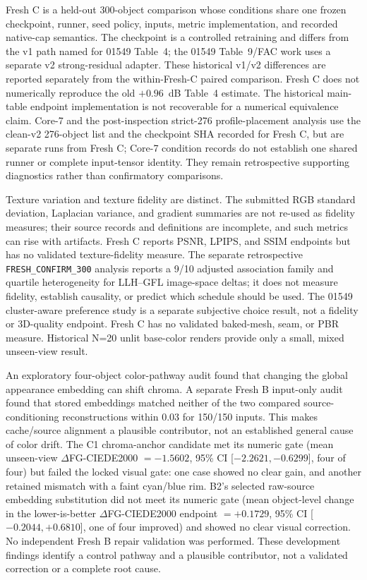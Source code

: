 \documentclass[times,twocolumn,final]{elsarticle}
\begin{document}
Fresh C is a held-out 300-object comparison whose conditions share one frozen checkpoint, runner, seed policy, inputs, metric implementation, and recorded native-cap semantics. The checkpoint is a controlled retraining and differs from the v1 path named for 01549 Table~4; the 01549 Table~9/FAC work uses a separate v2 strong-residual adapter. These historical v1/v2 differences are reported separately from the within-Fresh-C paired comparison. Fresh C does not numerically reproduce the old $+0.96$~dB Table~4 estimate. The historical main-table endpoint implementation is not recoverable for a numerical equivalence claim. Core-7 and the post-inspection strict-276 profile-placement analysis use the clean-v2 276-object list and the checkpoint SHA recorded for Fresh C, but are separate runs from Fresh C; Core-7 condition records do not establish one shared runner or complete input-tensor identity. They remain retrospective supporting diagnostics rather than confirmatory comparisons.

Texture variation and texture fidelity are distinct. The submitted RGB standard deviation, Laplacian variance, and gradient summaries are not re-used as fidelity measures; their source records and definitions are incomplete, and such metrics can rise with artifacts. Fresh C reports PSNR, LPIPS, and SSIM endpoints but has no validated texture-fidelity measure. The separate retrospective \texttt{FRESH\_CONFIRM\_300} analysis reports a 9/10 adjusted association family and quartile heterogeneity for LLH--GFL image-space deltas; it does not measure fidelity, establish causality, or predict which schedule should be used. The 01549 cluster-aware preference study is a separate subjective choice result, not a fidelity or 3D-quality endpoint. Fresh C has no validated baked-mesh, seam, or PBR measure. Historical N=20 unlit base-color renders provide only a small, mixed unseen-view result.

An exploratory four-object color-pathway audit found that changing the global appearance embedding can shift chroma. A separate Fresh B input-only audit found that stored embeddings matched neither of the two compared source-conditioning reconstructions within 0.03 for 150/150 inputs. This makes cache/source alignment a plausible contributor, not an established general cause of color drift. The C1 chroma-anchor candidate met its numeric gate (mean unseen-view $\Delta$FG-CIEDE2000 $=-1.5602$, 95\% CI [$-2.2621,-0.6299$], four of four) but failed the locked visual gate: one case showed no clear gain, and another retained mismatch with a faint cyan/blue rim. B2's selected raw-source embedding substitution did not meet its numeric gate (mean object-level change in the lower-is-better $\Delta$FG-CIEDE2000 endpoint $=+0.1729$, 95\% CI [$-0.2044,+0.6810$], one of four improved) and showed no clear visual correction. No independent Fresh B repair validation was performed. These development findings identify a control pathway and a plausible contributor, not a validated correction or a complete root cause.
\end{document}
